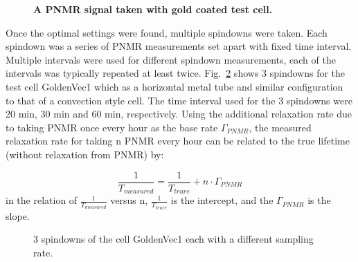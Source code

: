 \begin{figure}[H]
	\centering
	\caption{{\bf A PNMR signal taken with gold coated test cell.}}
	\label{FID}
\end{figure}

Once the optimal settings were found, multiple spindowns were taken. Each spindown was a series of PNMR measurements set apart with fixed time interval. Multiple intervals were used for different spindown measurements, each of the intervals was typically repeated at least twice. Fig.~\ref{3spindowns} shows 3 spindowns for the test cell GoldenVec1 which as a horizontal metal tube and similar configuration to that of a convection style cell. The time interval used for the 3 spindowns were 20 min, 30 min and 60 min, respectively. Using the additional relaxation rate due to taking PNMR once every hour as the base rate $\Gamma_{PNMR}$, the measured relaxation rate for taking n PNMR every hour can be related to the true lifetime (without relaxation from PNMR) by:

\begin{equation}
\frac{1}{T_{measured}} = \frac{1}{T_{trure}} + n\cdot \Gamma_{PNMR}
\end{equation}
in the relation of $\frac{1}{T_{measured}}$ versus n, $\frac{1}{T_{trure}}$ is the intercept, and the $\Gamma_{PNMR}$ is the slope.

\begin{figure}[t!]
	\centering
	\caption{{3 spindowns of the cell GoldenVec1 each with a different sampling rate.}}
	\label{3spindowns}
\end{figure}

